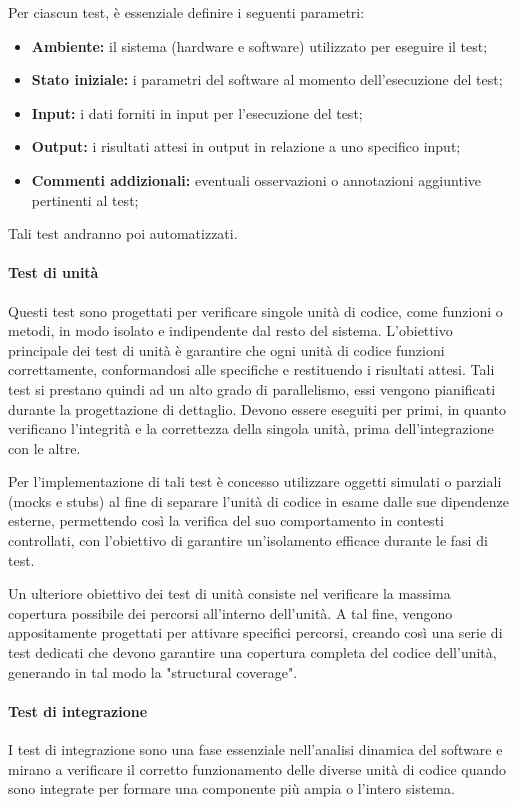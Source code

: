 Per ciascun test, è essenziale definire i seguenti parametri:

\begin{itemize}
    \item \textbf{Ambiente:} 
        il sistema (hardware e software) utilizzato per eseguire il test;
    \item \textbf{Stato iniziale:} 
        i parametri del software al momento dell'esecuzione del test;
    \item \textbf{Input:} 
        i dati forniti in input per l'esecuzione del test;
    \item \textbf{Output:} 
        i risultati attesi in output in relazione a uno specifico input;
    \item \textbf{Commenti addizionali:} 
        eventuali osservazioni o annotazioni aggiuntive pertinenti al test;
\end{itemize}
Tali test andranno poi automatizzati.

\paragraph{Test di unità}
Questi test sono progettati per verificare singole unità di codice, come funzioni o metodi, in modo isolato e indipendente dal resto del sistema. L'obiettivo principale dei test di unità è garantire che ogni unità di codice funzioni correttamente, conformandosi alle specifiche e restituendo i risultati attesi.
Tali test si prestano quindi ad un alto grado di parallelismo, essi vengono pianificati durante la progettazione di dettaglio.
Devono essere eseguiti per primi, in quanto verificano l’integrità e la correttezza della singola unità, prima dell’integrazione con le altre.

Per l'implementazione di tali test è concesso utilizzare oggetti simulati o parziali (mocks e stubs) al fine di separare l'unità di codice in esame dalle sue dipendenze esterne, permettendo così la verifica del suo comportamento in contesti controllati, con l'obiettivo di garantire un'isolamento efficace durante le fasi di test.

Un ulteriore obiettivo dei test di unità consiste nel verificare la massima copertura possibile dei percorsi all'interno dell'unità. A tal fine, vengono appositamente progettati per attivare specifici percorsi, creando così una serie di test dedicati che devono garantire una copertura completa del codice dell'unità, generando in tal modo la "structural coverage".

\paragraph{Test di integrazione}
I test di integrazione sono una fase essenziale nell'analisi dinamica del software e mirano a verificare il corretto funzionamento delle diverse unità di codice quando sono integrate per formare una componente più ampia o l'intero sistema.

